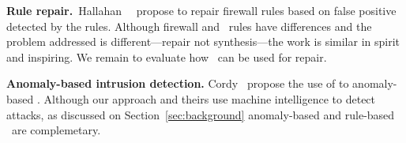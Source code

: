 \documentclass[sigconf,review, anonymous]{acmart}
\begin{document}


\noindent
\textbf{Rule repair.}~Hallahan~\etal{}~\cite{8102263} propose to
repair firewall rules based on false positive detected by the
rules. Although firewall and \nids\ rules have differences and the
problem addressed is different---repair not synthesis---the work is
similar in spirit and inspiring. We remain to evaluate how \tname\ can
be used for repair.

\noindent
\textbf{Anomaly-based intrusion detection.}
Cordy~\etal{}\cite{cordy-etal-issta19} propose the use of
 to 
anomaly-based \nids. Although our approach and theirs use machine
intelligence to detect attacks, as discussed on
Section~\ref{sec:background} anomaly-based and rule-based \nids\ are
complemetary.
\end{document}
